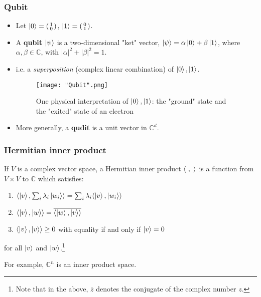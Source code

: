 \documentclass[handout, 10 pt]{beamer}
\newcommand{\icol}[1]{%
  \left(\begin{smallmatrix}#1\end{smallmatrix}\right)%
}
\begin{document}
\begin{frame}
\frametitle{Qubit}

\begin{itemize}
    \item Let $\ket{0} = \icol{1\\0}$, $\ket{1} = \icol{0\\1}$.
    \pause
    \item A \textbf{qubit} $\ket{\psi}$ is a two-dimensional "ket" vector, $\ket{\psi}=\alpha\ket{0}+\beta\ket{1}$, 
where $\alpha,\beta\in\mathbb{C}$, with $|\alpha|^2+|\beta|^2=1$.
\pause
\item i.e. a \textit{superposition} (complex linear combination) of $\ket{0}, \ket{1}$.
\pause
    \begin{figure}[h]
    \centering
    \texttt{[image: "Qubit".png]}
    \caption{One physical interpretation of $\ket{0},\ket{1}$: the "ground" state and the "exited" state of an electron}
    \label{fig: qubit}
    \end{figure}
\pause
\item More generally, a \textbf{qudit} is a unit vector in ${\mathbb{C}}^d$.
\end{itemize}
\end{frame}

\begin{frame}

\frametitle{Hermitian inner product}

If $V$ is a complex vector space, a Hermitian inner product $\langle\hspace{.1cm},\hspace{.1cm}\rangle$ is a function from $V \times V$ to $\mathbb{C}$ which satisfies: 
\pause
\begin{enumerate}
\item $\langle\ket{v}, \sum_i \lambda_i \ket{w_i}\rangle=\sum_i \lambda_i \langle\ket{v}, \ket{w_i}\rangle$
\pause
\item $\langle\ket{v}, \ket{w}\rangle=\overline{\langle\ket{w}, \ket{v}\rangle}$
\pause
\item $\langle\ket{v}, \ket{v}\rangle \ge 0$ \textrm{ with equality if and only if }$\ket{v}=0$
\pause
\end{enumerate}
for all $\ket{v}$ and $\ket{w}$.\footnote{Note that in the above, $\overline{z}$ denotes the conjugate of the complex number $z$.} 

\bigskip
For example, $\mathbb{C}^n$ is an inner product space.
\end{frame}
\end{document}
